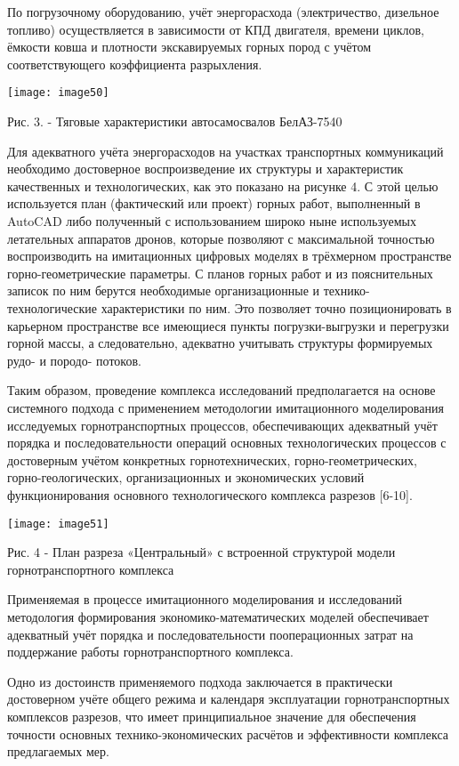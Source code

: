 По погрузочному оборудованию, учёт энергорасхода (электричество,
дизельное топливо) осуществляется в зависимости от КПД двигателя,
времени циклов, ёмкости ковша и плотности экскавируемых горных пород с
учётом соответствующего коэффициента разрыхления.

\texttt{[image: image50]}

Рис. 3. - Тяговые характеристики автосамосвалов БелАЗ-7540

Для адекватного учёта энергорасходов на участках транспортных
коммуникаций необходимо достоверное воспроизведение их структуры и
характеристик качественных и технологических, как это показано на
рисунке 4. С этой целью используется план (фактический или проект)
горных работ, выполненный в AutoCAD либо полученный с использованием
широко ныне используемых летательных аппаратов дронов, которые позволяют
с максимальной точностью воспроизводить на имитационных цифровых моделях
в трёхмерном пространстве горно-геометрические параметры. С планов
горных работ и из пояснительных записок по ним берутся необходимые
организационные и технико-технологические характеристики по ним. Это
позволяет точно позиционировать в карьерном пространстве все имеющиеся
пункты погрузки-выгрузки и перегрузки горной массы, а следовательно,
адекватно учитывать структуры формируемых рудо- и породо- потоков.

Таким образом, проведение комплекса исследований предполагается на
основе системного подхода с применением методологии имитационного
моделирования исследуемых горнотранспортных процессов, обеспечивающих
адекватный учёт порядка и последовательности операций основных
технологических процессов с достоверным учётом конкретных
горнотехнических, горно-геометрических, горно-геологических,
организационных и экономических условий функционирования основного
технологического комплекса разрезов {[}6-10{]}.

\texttt{[image: image51]}

Рис. 4 - План разреза «Центральный» с встроенной структурой модели
горнотранспортного комплекса

Применяемая в процессе имитационного моделирования и исследований
методология формирования экономико-математических моделей обеспечивает
адекватный учёт порядка и последовательности пооперационных затрат на
поддержание работы горнотранспортного комплекса.

Одно из достоинств применяемого подхода заключается в практически
достоверном учёте общего режима и календаря эксплуатации
горнотранспортных комплексов разрезов, что имеет принципиальное значение
для обеспечения точности основных технико-экономических расчётов и
эффективности комплекса предлагаемых мер.


